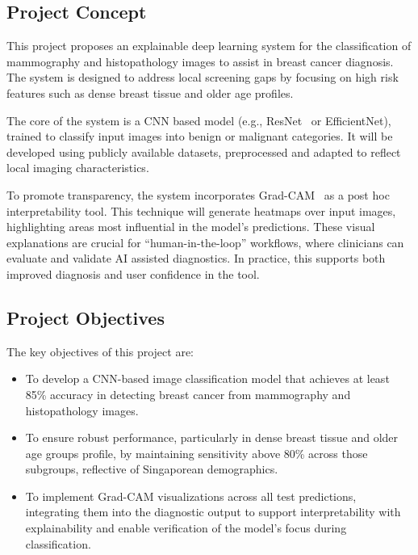 \documentclass[12pt]{article}
\begin{document}
\subsection{Project Concept}
This project proposes an explainable deep learning system for the classification of mammography and histopathology images to assist in breast cancer diagnosis. The system is designed to address local screening gaps by focusing on high risk features such as dense breast tissue and older age profiles.

The core of the system is a CNN based model (e.g., ResNet~\cite{17} or EfficientNet), trained to classify input images into benign or malignant categories. It will be developed using publicly available datasets, preprocessed and adapted to reflect local imaging characteristics.

To promote transparency, the system incorporates Grad-CAM~\cite{5} as a post hoc interpretability tool. This technique will generate heatmaps over input images, highlighting areas most influential in the model’s predictions. These visual explanations are crucial for ``human-in-the-loop'' workflows, where clinicians can evaluate and validate AI assisted diagnostics. In practice, this supports both improved diagnosis and user confidence in the tool.

\subsection{Project Objectives}
\label{sec:objectives}
The key objectives of this project are:
\begin{itemize}
    \item To develop a CNN-based image classification model that achieves at least {85\% accuracy} in detecting breast cancer from mammography and histopathology images.
    \item To ensure robust performance, particularly in dense breast tissue and older age groups profile, by maintaining sensitivity above 80\% across those subgroups, reflective of Singaporean demographics.
    \item To implement Grad-CAM visualizations across all test predictions, integrating them into the diagnostic output to support interpretability with explainability and enable verification of the model’s focus during classification.
\end{itemize}
\end{document}
